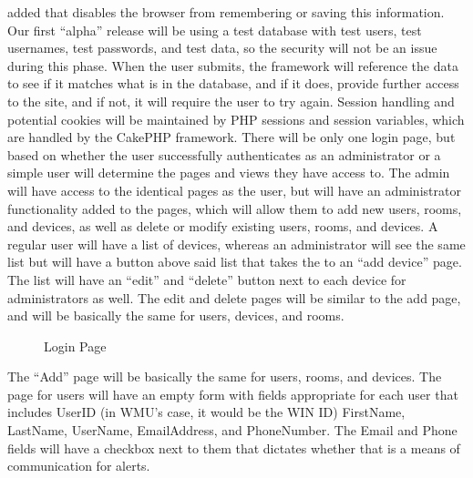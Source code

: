\documentclass{report}
\begin{document}
added that disables the browser from remembering or saving this information. 
Our first “alpha” release will be using a test database with test users, test usernames, test passwords, and test data, so the security
will not be an issue during this phase. When the user submits, the framework will reference the data to see if it matches what is in the database, and if it does, provide further access to the site, and if not, it will require the user to try again. 
Session handling and potential cookies will be maintained by PHP sessions and session variables, which are handled by the CakePHP framework.
\newline
\indent
There will be only one login page, but based on whether the user successfully authenticates as an administrator or a simple user will determine the pages and views they have access to. 
The admin will have access to the identical pages as the user, but will have an administrator functionality added to the pages, which will allow them to add new users, rooms, and devices, as well as delete or modify existing users, rooms, and devices. 
A regular user will have a list of devices, whereas an administrator will see the same list but will have a button above said list that takes the to an “add device” page.  
The list will have an “edit” and “delete” button next to each device for administrators as well. The edit and delete pages will be similar to the add page, and will be basically the same for users, devices, and rooms. 
\begin{figure}[H]
\caption{Login Page}
\end{figure}
\newpage
The “Add” page will be basically the same for users, rooms, and devices. 
The page for users will have an empty form with fields appropriate for each user that includes UserID (in WMU’s case, it would be the WIN ID) FirstName, LastName, UserName, EmailAddress, and PhoneNumber. 
The Email and Phone fields will have a checkbox next to them that dictates whether that is a means of communication for alerts. 
\end{document}
